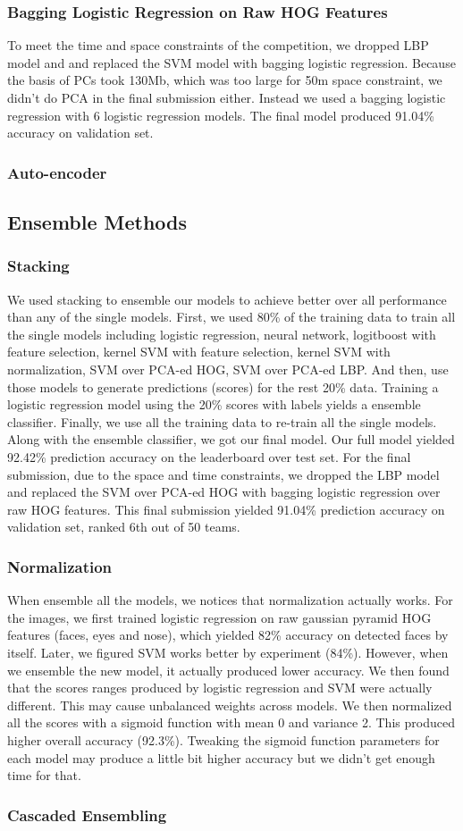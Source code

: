 \subsubsection{Bagging Logistic Regression on Raw HOG Features}
To meet the time and space constraints of the competition, we dropped LBP model and and replaced the SVM model with bagging logistic regression. Because the basis of PCs took 130Mb, which was too large for 50m space constraint, we didn't do PCA in the final submission either. Instead we used a bagging logistic regression with 6 logistic regression  models. The final model produced 91.04\% accuracy on validation set.
\subsubsection{Auto-encoder}
\subsection{Ensemble Methods}
\subsubsection{Stacking}
We used stacking to ensemble our models to achieve better over all performance than any of the single models. First, we used 80\% of the training data to train all the single models including logistic regression, neural network, logitboost with feature selection, kernel SVM with feature selection, kernel SVM with normalization, SVM over PCA-ed HOG, SVM over PCA-ed LBP. And then, use those models to generate predictions (scores) for the rest 20\% data. Training a logistic regression model using the 20\% scores with labels yields a ensemble classifier. Finally, we use all the training data to re-train all the single models. Along with the ensemble classifier, we got our final model. Our full model yielded 92.42\% prediction accuracy on the leaderboard over test set. For the final submission, due to the space and time constraints, we dropped the LBP model and replaced the SVM over PCA-ed HOG with bagging logistic regression over raw HOG features. This final submission yielded 91.04\% prediction accuracy on validation set, ranked 6th out of 50 teams.
\subsubsection{Normalization}
When ensemble all the models, we notices that normalization actually works. For the images, we first trained logistic regression on raw gaussian pyramid HOG features (faces, eyes and nose), which yielded 82\% accuracy on detected faces by itself. Later, we figured SVM works better by experiment (84\%). However, when we ensemble the new model, it actually produced lower accuracy. We then found that the scores ranges produced by logistic regression and SVM were actually different. This may cause unbalanced weights across models. We then normalized all the scores with a sigmoid function with mean 0 and variance 2. This produced higher overall accuracy (92.3\%). Tweaking the sigmoid function parameters for each model may produce a little bit higher accuracy but we didn't get enough time for that.
\subsubsection{Cascaded Ensembling}


